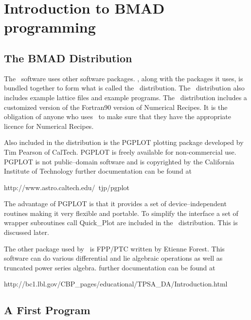 \chapter{Introduction to BMAD programming}

\section{The BMAD Distribution}

The \bmad\ software uses other software packages. \bmad, along with the packages it uses, 
is bundled together to form what is called the \bmad\ distribution. The \bmad\ distribution
also includes example lattice files and example programs. The \bmad\ distribution includes a customized version of the Fortran90 version of Numerical Recipes\cite{b:nr}. It is the obligation of anyone who uses \bmad\ to make sure that they have the appropriate licence for Numerical Recipes. 

Also included in the distribution is the PGPLOT plotting package developed by Tim Pearson of CalTech.
PGPLOT is freely available for non-commercial use. PGPLOT is not public--domain software and is copyrighted by the California Institute of Technology further documentation can be found at
\begin{example}
    http://www.astro.caltech.edu/~tjp/pgplot
\end{example}
The advantage of PGPLOT is that it provides a set of device--independent routines making it very flexible and portable. To simplify the interface a set of wrapper subroutines call Quick\_Plot are
included in the \bmad\ distribution. This is discussed later.

The other package used by \bmad\ is FPP/PTC written by Etienne Forest. This software can do 
various differential and lie algebraic operations as well as truncated power series algebra. further
documentation can be found at
\begin{example}
    http://bc1.lbl.gov/CBP_pages/educational/TPSA_DA/Introduction.html
\end{example}

\section{A First Program}

